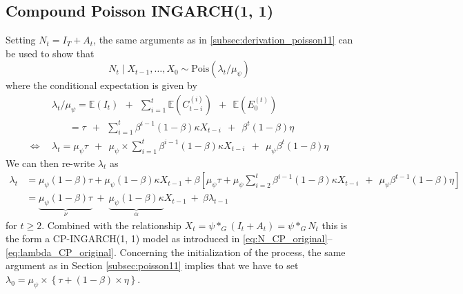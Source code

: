 \documentclass{article}
\begin{document}
\subsection{Compound Poisson INGARCH(1, 1)}

Setting $N_t = I_T + A_t$, the same arguments as in \eqref{subsec:derivation_poisson11} can be used to show that
$$
N_t \mid X_{t - 1}, \dots, X_0 \sim \text{Pois}(\lambda_t/\mu_\psi)
$$
where the conditional expectation is given by
\begin{align*}
& \lambda_t/\mu_\psi = \mathbb{E}(I_t) \ \ + \ \ \sum_{i = 1}^t \mathbb{E}(C_{t - i}^{(i)}) \ \ + \ \ \mathbb{E}(E_0^{(t)})\\
& \ \ \ \ \ \ \ \ = \tau \ \ + \ \ \sum_{i = 1}^t \beta^{i - 1}(1 - \beta)\kappa X_{t - i} \ \ + \ \ \beta^{t}(1 - \beta)\eta\\
\Leftrightarrow \ \ & \lambda_t = \mu_\psi \tau \ \ + \ \ \mu_\psi \times \sum_{i = 1}^t \beta^{i - 1}(1 - \beta)\kappa X_{t - i} \ \ + \ \ \mu_\psi\beta^{t}(1 - \beta)\eta
\end{align*}
We can then re-write $\lambda_t$ as
\begin{align*}
\lambda_t & = \mu_\psi(1 - \beta)\tau + \mu_\psi(1 - \beta)\kappa X_{t - 1} + \beta \left[\mu_\psi\tau +   \mu_\psi \sum_{i = 2}^t \beta^{i - 1}(1 - \beta)\kappa X_{t - i}  \ \ + \ \ \mu_\psi\beta^{t - 1}(1 - \beta)\eta\right]\\
& = \underbrace{\mu_\psi(1 - \beta)\tau}_{\nu} \ + \ \underbrace{\mu_\psi(1 - \beta)\kappa}_{\alpha} X_{t - 1} \ + \ \beta \lambda_{t - 1}
\end{align*}
for $t \geq 2$. Combined with the relationship $X_t = \psi *_G (I_t + A_t) = \psi *_G N_t$ this is the form a CP-INGARCH(1, 1) model as introduced in \eqref{eq:N_CP_original}--\eqref{eq:lambda_CP_original}. Concerning the initialization of the process, the same argument as in Section \ref{subsec:poisson11} implies that we have to set $\lambda_0 = \mu_\psi\times \left\{\tau + (1 - \beta) \times \eta\right\}$.

\end{document}
